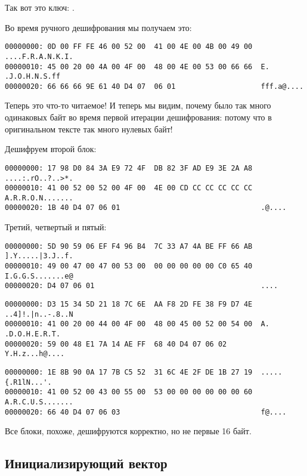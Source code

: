 Так вот это ключ: .

Во время ручного дешифрования мы получаем это:

\begin{lstlisting}
00000000: 0D 00 FF FE 46 00 52 00  41 00 4E 00 4B 00 49 00  ....F.R.A.N.K.I.
00000010: 45 00 20 00 4A 00 4F 00  48 00 4E 00 53 00 66 66  E. .J.O.H.N.S.ff
00000020: 66 66 66 9E 61 40 D4 07  06 01                    fff.a@....
\end{lstlisting}

Теперь это что-то читаемое!
И теперь мы видим, почему было так много одинаковых байт во время первой итерации дешифрования:
потому что в оригинальном тексте так много нулевых байт!

Дешифруем второй блок:

\begin{lstlisting}
00000000: 17 98 D0 84 3A E9 72 4F  DB 82 3F AD E9 3E 2A A8  ....:.rO..?..>*.
00000010: 41 00 52 00 52 00 4F 00  4E 00 CD CC CC CC CC CC  A.R.R.O.N.......
00000020: 1B 40 D4 07 06 01                                 .@....
\end{lstlisting}

Третий, четвертый и пятый:

\begin{lstlisting}
00000000: 5D 90 59 06 EF F4 96 B4  7C 33 A7 4A BE FF 66 AB  ].Y.....|3.J..f.
00000010: 49 00 47 00 47 00 53 00  00 00 00 00 00 C0 65 40  I.G.G.S.......e@
00000020: D4 07 06 01                                       ....
\end{lstlisting}

\begin{lstlisting}
00000000: D3 15 34 5D 21 18 7C 6E  AA F8 2D FE 38 F9 D7 4E  ..4]!.|n..-.8..N
00000010: 41 00 20 00 44 00 4F 00  48 00 45 00 52 00 54 00  A. .D.O.H.E.R.T.
00000020: 59 00 48 E1 7A 14 AE FF  68 40 D4 07 06 02        Y.H.z...h@....
\end{lstlisting}

\begin{lstlisting}
00000000: 1E 8B 90 0A 17 7B C5 52  31 6C 4E 2F DE 1B 27 19  .....{.R1lN...'.
00000010: 41 00 52 00 43 00 55 00  53 00 00 00 00 00 00 60  A.R.C.U.S.......
00000020: 66 40 D4 07 06 03                                 f@....
\end{lstlisting}

Все блоки, похоже, дешифруются корректно, но не первые 16 байт.

\subsection{Инициализирующий вектор}


